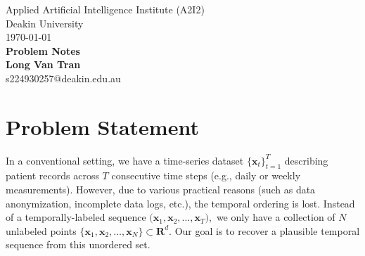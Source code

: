 \documentclass[a4paper, 11pt]{article}
\begin{document}
\begin{sloppypar}
\begin{center}
Applied Artificial Intelligence Institute (A2I2)\\
Deakin University\\
\today\\[24pt]
\LARGE
\textbf{Problem Notes}\\[6pt]
\small
\textbf {Long Van Tran}\\[6pt]
s224930257@deakin.edu.au\\[6pt]
\end{center}





\section{Problem Statement}\label{s:1}
In a conventional setting, we have a time-series dataset $\{ \mathbf{x}_t \}_{t=1}^T$ 
describing patient records across \(T\) consecutive time steps (e.g., daily or weekly 
measurements). However, due to various practical reasons (such as data anonymization, 
incomplete data logs, etc.), the temporal ordering is lost. Instead of a temporally-labeled sequence
$\bigl(\mathbf{x}_1, \mathbf{x}_2, \dots, \mathbf{x}_T\bigr),$ we only have a collection of
\(N\) unlabeled points $\{\mathbf{x}_1, \mathbf{x}_2, \dots, \mathbf{x}_N\} \subset \mathbf{R}^d.$
Our goal is to recover a plausible temporal sequence from this unordered set.


\end{sloppypar}
\end{document}
